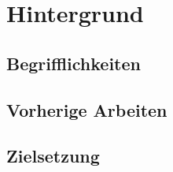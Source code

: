\chapter{Hintergrund}
\label{ch:background}

\blindtext

\section{Begrifflichkeiten}
\label{sec:background:definitions}

\blindtext

\section{Vorherige Arbeiten}
\label{sec:background:previous_work}

\blindtext

\section{Zielsetzung}
\label{sec:background:goal}

\blindtext